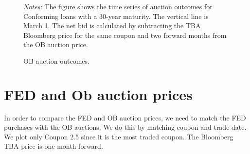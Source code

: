 \documentclass[11pt,a4paper]{article}
\begin{document}
\begin{figure}[]
   \caption{OB auction outcomes. } 
   \begin{minipage}{\textwidth}
      \footnotesize{\textit{Notes:} The figure shows the time series of auction outcomes for Conforming loans with a 30-year maturity.  The vertical line is March 1. The net bid is calculated by subtracting the TBA Bloomberg price for the same coupon and two forward months from the OB auction price. }
      \end{minipage}
\end{figure}


\pagebreak


  \section{FED and Ob auction prices}

  In order to compare the FED and OB auction prices, we need to match the FED purchases with the OB auctions. We do this by matching coupon and trade date. We plot only Coupon 2.5 since it is the most traded coupon. The Bloomberg TBA price is one month forward.
\end{document}
